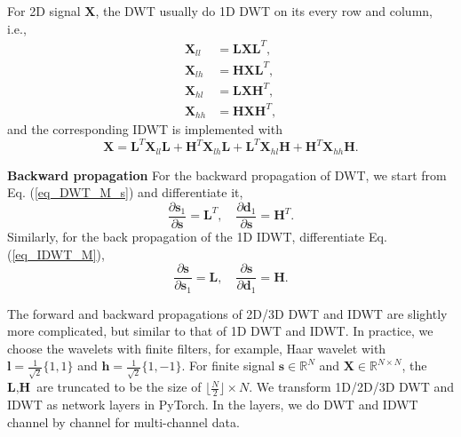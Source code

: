 \documentclass[10pt,twocolumn,letterpaper]{article}
\begin{document}
For 2D signal $\textbf{X}$, the DWT usually do 1D DWT
on its every row and column, i.e.,
\begin{align}
\label{eq_DWT_2D_M_ll}
\textbf{X}_{ll} &= \textbf{L} \textbf{X} \textbf{L}^T, \\
\label{eq_DWT_2D_M_lh}
\textbf{X}_{lh} &= \textbf{H} \textbf{X} \textbf{L}^T, \\
\label{eq_DWT_2D_M_hl}
\textbf{X}_{hl} &= \textbf{L} \textbf{X} \textbf{H}^T, \\
\label{eq_DWT_2D_M_hh}
\textbf{X}_{hh} &= \textbf{H} \textbf{X} \textbf{H}^T,
\end{align}
and the corresponding IDWT is implemented with
\begin{equation}\label{eq_IDWT_2D_M}
\textbf{X} = \textbf{L}^T \textbf{X}_{ll} \textbf{L}
+ \textbf{H}^T \textbf{X}_{lh} \textbf{L}
+ \textbf{L}^T \textbf{X}_{hl} \textbf{H}
+ \textbf{H}^T \textbf{X}_{hh} \textbf{H}.
\end{equation}

\textbf{Backward propagation}\quad
For the backward propagation of DWT, we start from Eq. (\ref{eq_DWT_M_s}) and differentiate it,
\begin{equation}\label{eq_DWT_bp}
\frac{\partial \textbf{s}_1}{\partial\textbf{s}} = \textbf{L}^T,\quad \frac{\partial \textbf{d}_1}{\partial\textbf{s}} = \textbf{H}^T.
\end{equation}
Similarly, for the back propagation of the 1D IDWT, differentiate Eq. (\ref{eq_IDWT_M}),
\begin{equation}\label{eq_IDWT_bp}
\frac{\partial{\textbf{s}}}{\partial{\textbf{s}}_1} = \textbf{L},\quad \frac{\partial{\textbf{s}}}{\partial{\textbf{d}}_1} = \textbf{H}.
\end{equation}

The forward and backward propagations of 2D/3D DWT and IDWT are slightly more complicated, but similar to that of 1D DWT and IDWT.
In practice, we choose the wavelets with finite filters, for example,
Haar wavelet with $\textbf{l} = \frac{1}{\sqrt{2}}\{1,1\}$ and $\textbf{h} = \frac{1}{\sqrt{2}}\{1,-1\}$.
For finite signal $\textbf{s} \in \mathbb{R}^N$ and  $\textbf{X} \in \mathbb{R}^{N\times N}$,
the $\textbf{L}, \textbf{H}$ are truncated to be the size of $\lfloor\frac{N}{2}\rfloor\times N$.
We transform 1D/2D/3D DWT and IDWT as network layers in PyTorch.
In the layers, we do DWT and IDWT channel by channel for multi-channel data.
\end{document}
